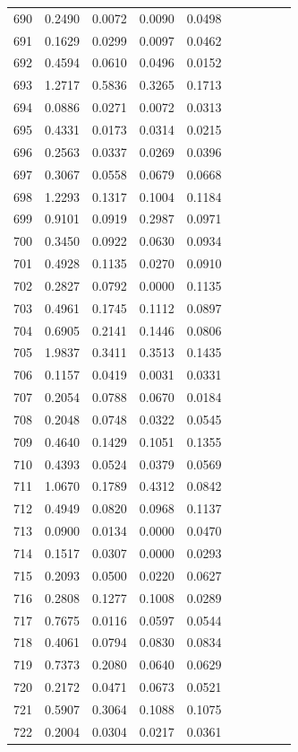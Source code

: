 \begin{table}
\begin{tabular}{cccccccccc}
690& 0.2490& 0.0072& 0.0090& 0.0498\\ 
691& 0.1629& 0.0299& 0.0097& 0.0462\\ 
692& 0.4594& 0.0610& 0.0496& 0.0152\\ 
693& 1.2717& 0.5836& 0.3265& 0.1713\\ 
694& 0.0886& 0.0271& 0.0072& 0.0313\\ 
695& 0.4331& 0.0173& 0.0314& 0.0215\\ 
696& 0.2563& 0.0337& 0.0269& 0.0396\\ 
697& 0.3067& 0.0558& 0.0679& 0.0668\\ 
698& 1.2293& 0.1317& 0.1004& 0.1184\\ 
699& 0.9101& 0.0919& 0.2987& 0.0971\\ 
700& 0.3450& 0.0922& 0.0630& 0.0934\\ 
701& 0.4928& 0.1135& 0.0270& 0.0910\\ 
702& 0.2827& 0.0792& 0.0000& 0.1135\\ 
703& 0.4961& 0.1745& 0.1112& 0.0897\\ 
704& 0.6905& 0.2141& 0.1446& 0.0806\\ 
705& 1.9837& 0.3411& 0.3513& 0.1435\\ 
706& 0.1157& 0.0419& 0.0031& 0.0331\\ 
707& 0.2054& 0.0788& 0.0670& 0.0184\\ 
708& 0.2048& 0.0748& 0.0322& 0.0545\\ 
709& 0.4640& 0.1429& 0.1051& 0.1355\\ 
710& 0.4393& 0.0524& 0.0379& 0.0569\\ 
711& 1.0670& 0.1789& 0.4312& 0.0842\\ 
712& 0.4949& 0.0820& 0.0968& 0.1137\\ 
713& 0.0900& 0.0134& 0.0000& 0.0470\\ 
714& 0.1517& 0.0307& 0.0000& 0.0293\\ 
715& 0.2093& 0.0500& 0.0220& 0.0627\\ 
716& 0.2808& 0.1277& 0.1008& 0.0289\\ 
717& 0.7675& 0.0116& 0.0597& 0.0544\\ 
718& 0.4061& 0.0794& 0.0830& 0.0834\\ 
719& 0.7373& 0.2080& 0.0640& 0.0629\\ 
720& 0.2172& 0.0471& 0.0673& 0.0521\\ 
721& 0.5907& 0.3064& 0.1088& 0.1075\\ 
722& 0.2004& 0.0304& 0.0217& 0.0361\\ 

\end{tabular}
\end{table}
